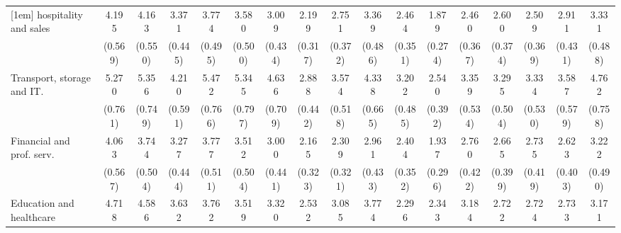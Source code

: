 {\begin{tabular}{l*{16}{c}}
[1em]
hospitality and sales&       4.195\sym{***}&       4.163\sym{***}&       3.371\sym{***}&       3.774\sym{***}&       3.580\sym{***}&       3.009\sym{***}&       2.199\sym{***}&       2.751\sym{***}&       3.369\sym{***}&       2.464\sym{***}&       1.879\sym{***}&       2.460\sym{***}&       2.600\sym{***}&       2.509\sym{***}&       2.911\sym{***}&       3.331\sym{***}\\
                    &     (0.569)         &     (0.550)         &     (0.445)         &     (0.495)         &     (0.500)         &     (0.434)         &     (0.317)         &     (0.372)         &     (0.486)         &     (0.351)         &     (0.274)         &     (0.367)         &     (0.374)         &     (0.369)         &     (0.431)         &     (0.488)         \\
[1em]
Transport, storage and IT.&       5.270\sym{***}&       5.356\sym{***}&       4.210\sym{***}&       5.472\sym{***}&       5.345\sym{***}&       4.636\sym{***}&       2.888\sym{***}&       3.574\sym{***}&       4.338\sym{***}&       3.202\sym{***}&       2.540\sym{***}&       3.359\sym{***}&       3.295\sym{***}&       3.334\sym{***}&       3.587\sym{***}&       4.762\sym{***}\\
                    &     (0.761)         &     (0.749)         &     (0.591)         &     (0.766)         &     (0.797)         &     (0.709)         &     (0.442)         &     (0.518)         &     (0.665)         &     (0.485)         &     (0.392)         &     (0.534)         &     (0.504)         &     (0.530)         &     (0.579)         &     (0.758)         \\
[1em]
Financial and prof. serv.&       4.063\sym{***}&       3.744\sym{***}&       3.277\sym{***}&       3.777\sym{***}&       3.512\sym{***}&       3.000\sym{***}&       2.165\sym{***}&       2.309\sym{***}&       2.961\sym{***}&       2.404\sym{***}&       1.937\sym{***}&       2.760\sym{***}&       2.665\sym{***}&       2.735\sym{***}&       2.623\sym{***}&       3.222\sym{***}\\
                    &     (0.567)         &     (0.504)         &     (0.444)         &     (0.511)         &     (0.504)         &     (0.441)         &     (0.323)         &     (0.321)         &     (0.433)         &     (0.352)         &     (0.296)         &     (0.422)         &     (0.399)         &     (0.419)         &     (0.403)         &     (0.490)         \\
[1em]
Education and healthcare&       4.718\sym{***}&       4.586\sym{***}&       3.632\sym{***}&       3.762\sym{***}&       3.519\sym{***}&       3.320\sym{***}&       2.532\sym{***}&       3.085\sym{***}&       3.774\sym{***}&       2.296\sym{***}&       2.343\sym{***}&       3.184\sym{***}&       2.722\sym{***}&       2.724\sym{***}&       2.733\sym{***}&       3.171\sym{***}\\

\end{tabular}}
